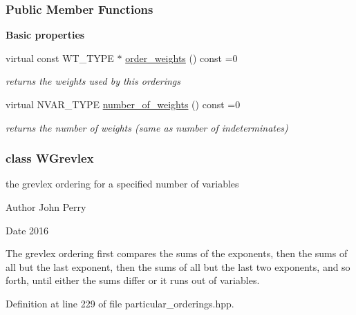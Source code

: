 \subsubsection*{Public Member Functions}
\begin{Indent}\textbf{ Basic properties}\par
\begin{DoxyCompactItemize}
\item 
\mbox{\label{group__orderinggroup_a5916f1631d5c30fe39dedcef96a3944e}} 
virtual const W\+T\+\_\+\+T\+Y\+PE $\ast$ \hyperlink{group__orderinggroup_a5916f1631d5c30fe39dedcef96a3944e}{order\+\_\+weights} () const =0
\begin{DoxyCompactList}\small\item\em returns the weights used by this orderings \end{DoxyCompactList}\item 
\mbox{\label{group__orderinggroup_a7f13d8c571e36bc29d2de39ace88bdd8}} 
virtual N\+V\+A\+R\+\_\+\+T\+Y\+PE \hyperlink{group__orderinggroup_a7f13d8c571e36bc29d2de39ace88bdd8}{number\+\_\+of\+\_\+weights} () const =0
\begin{DoxyCompactList}\small\item\em returns the number of weights (same as number of indeterminates) \end{DoxyCompactList}\end{DoxyCompactItemize}
\end{Indent}
\label{class_w_grevlex}
\subsubsection{class W\+Grevlex}
the grevlex ordering for a specified number of variables 

\begin{DoxyAuthor}{Author}
John Perry 
\end{DoxyAuthor}
\begin{DoxyDate}{Date}
2016
\end{DoxyDate}
The grevlex ordering first compares the sums of the exponents, then the sums of all but the last exponent, then the sums of all but the last two exponents, and so forth, until either the sums differ or it runs out of variables. 

Definition at line 229 of file particular\+\_\+orderings.\+hpp.

